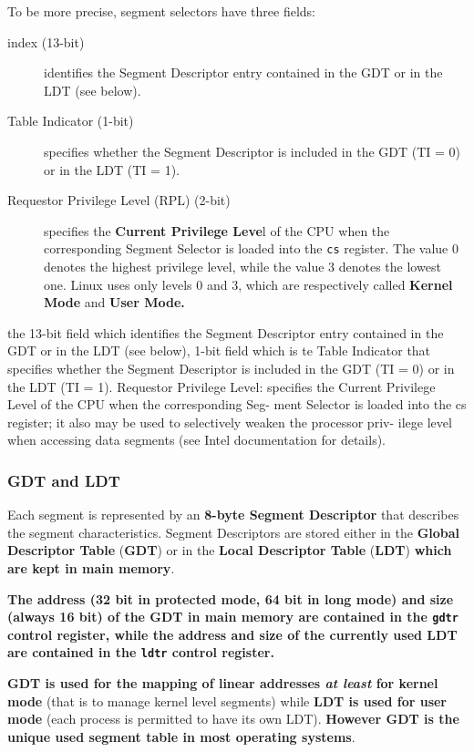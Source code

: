 \documentclass[10pt,a4paper]{article}
\begin{document}
To be more precise, segment selectors have three fields:
\begin{description}
\item[index (13-bit)] identifies the Segment Descriptor entry contained in the GDT or in the LDT (see below).
\item[Table Indicator (1-bit)] specifies whether the Segment Descriptor is included in the GDT (TI = 0) or in the LDT (TI = 1).
\item[Requestor Privilege Level (RPL) (2-bit)] specifies the \textbf{Current Privilege Leve}l of the CPU when the corresponding Segment Selector is loaded into the \texttt{cs} register. The value 0 denotes the highest privilege level, while the value 3 denotes the lowest one. Linux uses only levels 0 and 3, which are respectively called \textbf{Kernel Mode} and \textbf{User Mode.}

\end{description}

 the 13-bit field which identifies the Segment Descriptor entry contained in the GDT or in the LDT (see below), 1-bit field which is te Table Indicator that specifies whether the Segment Descriptor is included in the GDT (TI = 0) or in the LDT (TI = 1). Requestor Privilege Level: specifies the Current Privilege Level of the CPU when the corresponding Seg-
ment Selector is loaded into the cs register; it also may be used to selectively weaken the processor priv-
ilege level when accessing data segments (see Intel documentation for details).

\subsubsection{GDT and LDT}

Each segment is represented by an \textbf{8-byte Segment Descriptor} that describes the segment characteristics. Segment Descriptors are stored either in the \textbf{Global Descriptor Table} (\textbf{GDT}) or in the \textbf{Local Descriptor Table} (\textbf{LDT}) \textbf{which are kept in main memory}.

\textbf{The address (32 bit in protected mode, 64 bit in long mode) and size (always 16 bit) of the GDT in main memory are contained in the \texttt{gdtr} control register, while the address and size of the currently used LDT are contained in the \texttt{ldtr} control register.}

\textbf{GDT is used for the mapping of linear addresses \textit{at least} for kernel mode} (that is to manage kernel level segments) while \textbf{LDT is used for user mode} (each process is permitted to have its own LDT). \textbf{However GDT is the unique used segment table in most operating systems}.
\end{document}
